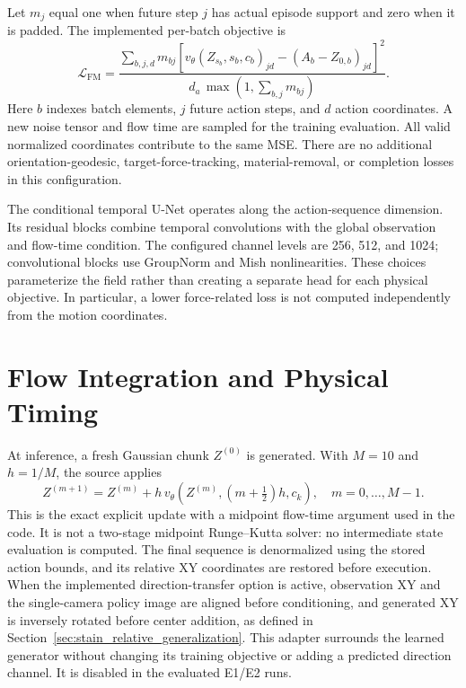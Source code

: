 Let \(m_j\) equal one when future step \(j\) has actual episode support and zero when it is padded. The implemented per-batch objective is
\begin{equation}
 \mathcal L_{\mathrm{FM}}=
 \frac{\displaystyle\sum_{b,j,d}m_{bj}
 \left[v_\theta(Z_{s_b},s_b,c_b)_{jd}-(A_b-Z_{0,b})_{jd}\right]^2}
 {d_a\,\max\!\left(1,\sum_{b,j}m_{bj}\right)}.
 \label{eq:imitation_loss}
\end{equation}
Here \(b\) indexes batch elements, \(j\) future action steps, and \(d\) action coordinates. A new noise tensor and flow time are sampled for the training evaluation. All valid normalized coordinates contribute to the same MSE. There are no additional orientation-geodesic, target-force-tracking, material-removal, or completion losses in this configuration.

The conditional temporal U-Net operates along the action-sequence dimension. Its residual blocks combine temporal convolutions with the global observation and flow-time condition. The configured channel levels are 256, 512, and 1024; convolutional blocks use GroupNorm and Mish nonlinearities. These choices parameterize the field rather than creating a separate head for each physical objective. In particular, a lower force-related loss is not computed independently from the motion coordinates.

\section{Flow Integration and Physical Timing}
At inference, a fresh Gaussian chunk \(Z^{(0)}\) is generated. With \(M=10\) and \(h=1/M\), the source applies
\begin{equation}
 Z^{(m+1)}=Z^{(m)}+h\,
 v_\theta\!\left(Z^{(m)},(m+\tfrac12)h,c_k\right),
 \quad m=0,\ldots,M-1.
 \label{eq:flow_integration}
\end{equation}
This is the exact explicit update with a midpoint flow-time argument used in the code. It is not a two-stage midpoint Runge--Kutta solver: no intermediate state evaluation is computed. The final sequence is denormalized using the stored action bounds, and its relative XY coordinates are restored before execution. When the implemented direction-transfer option is active, observation XY and the single-camera policy image are aligned before conditioning, and generated XY is inversely rotated before center addition, as defined in Section~\ref{sec:stain_relative_generalization}. This adapter surrounds the learned generator without changing its training objective or adding a predicted direction channel. It is disabled in the evaluated E1/E2 runs.


